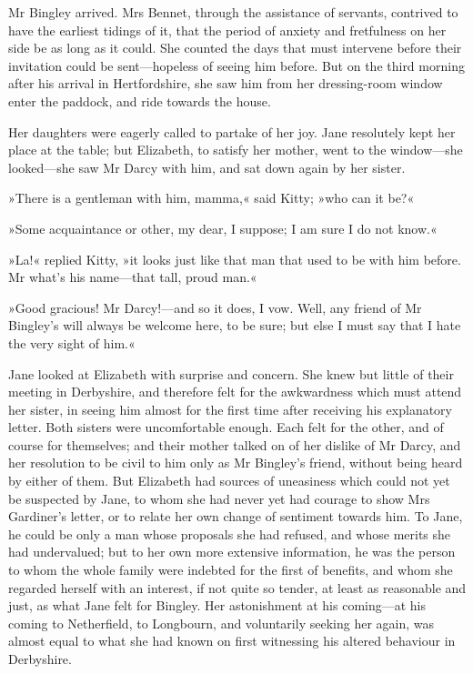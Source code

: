 Mr Bingley arrived. Mrs Bennet, through the assistance of servants, contrived to have the earliest tidings of it, that the period of anxiety and fretfulness on her side be as long as it could. She counted the days that must intervene before their invitation could be sent—hopeless of seeing him before. But on the third morning after his arrival in Hertfordshire, she saw him from her dressing-room window enter the paddock, and ride towards the house.

Her daughters were eagerly called to partake of her joy. Jane resolutely kept her place at the table; but Elizabeth, to satisfy her mother, went to the window—she looked—she saw Mr Darcy with him, and sat down again by her sister.

»There is a gentleman with him, mamma,« said Kitty; »who can it be?«

»Some acquaintance or other, my dear, I suppose; I am sure I do not know.«

»La!« replied Kitty, »it looks just like that man that used to be with him before. Mr what's his name—that tall, proud man.«

»Good gracious! Mr Darcy!—and so it does, I vow. Well, any friend of Mr Bingley's will always be welcome here, to be sure; but else I must say that I hate the very sight of him.«

Jane looked at Elizabeth with surprise and concern. She knew but little of their meeting in Derbyshire, and therefore felt for the awkwardness which must attend her sister, in seeing him almost for the first time after receiving his explanatory letter. Both sisters were uncomfortable enough. Each felt for the other, and of course for themselves; and their mother talked on of her dislike of Mr Darcy, and her resolution to be civil to him only as Mr Bingley's friend, without being heard by either of them. But Elizabeth had sources of uneasiness which could not yet be suspected by Jane, to whom she had never yet had courage to show Mrs Gardiner's letter, or to relate her own change of sentiment towards him. To Jane, he could be only a man whose proposals she had refused, and whose merits she had undervalued; but to her own more extensive information, he was the person to whom the whole family were indebted for the first of benefits, and whom she regarded herself with an interest, if not quite so tender, at least as reasonable and just, as what Jane felt for Bingley. Her astonishment at his coming—at his coming to Netherfield, to Longbourn, and voluntarily seeking her again, was almost equal to what she had known on first witnessing his altered behaviour in Derbyshire.

